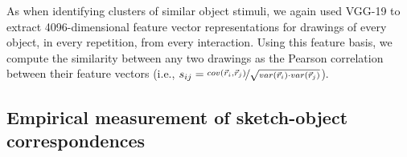 \documentclass[11pt,letterpaper]{article}
\begin{document}
As when identifying clusters of similar object stimuli, we again used VGG-19 to extract 4096-dimensional feature vector representations for drawings of every object, in every repetition, from every interaction.
Using this feature basis, we compute the similarity between any two drawings as the Pearson correlation between their feature vectors (i.e., $s_{ij} =  \nicefrac{cov(\vec{r}_{i}, \vec{r}_{j})}{\sqrt{var(\vec{r}_{i}) \cdot var(\vec{r}_{j})}}$).



\subsection{Empirical measurement of sketch-object correspondences}
\end{document}
